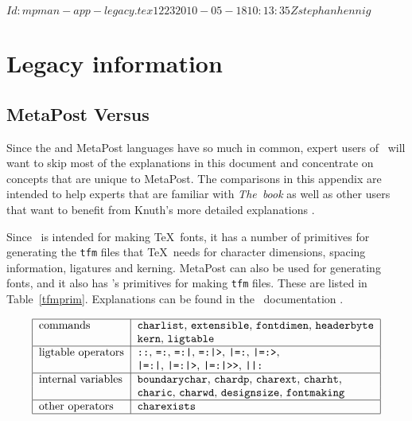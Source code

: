 \svnInfo $Id: mpman-app-legacy.tex 1223 2010-05-18 10:13:35Z stephanhennig $
\section{Legacy information}
\label{legacy}

\subsection{MetaPost Versus \MF}
\label{MPvsMF}

Since the \MF{} and MetaPost languages have so much in
common, expert users of \MF\ will want to skip most of the explanations
in this document and concentrate on concepts that are unique to
MetaPost.  The comparisons in this appendix are intended to help experts
that are familiar with {\sl The\ \MF book} as well as other users that
want to benefit from Knuth's more detailed explanations \cite{kn:c}.

Since \MF\ is intended for making \TeX\ fonts, it has a number of
primitives for generating the {\tt tfm} files that \TeX\ needs for character
dimensions, spacing information, ligatures and
kerning.  MetaPost can also be used for generating fonts,
and it also has \MF's primitives for making {\tt tfm} files.  These are
listed in Table~\ref{tfmprim}.  Explanations can be found in the \MF\
documentation \cite{kn:c,kn:mf3}.

\begin{table}[htp]
$$\begin{tabular}{|l|l|}  \hline
commands&               {\tt charlist}, {\tt extensible},
                        {\tt fontdimen}, {\tt headerbyte}               \\
        &               {\tt kern}, {\tt ligtable}                      \\ \hline
ligtable operators&     \verb!::!, \verb!=:!, \verb!=:|!, \verb!=:|>!,
                        \verb!|=:!, \verb!|=:>!,                        \\
        &               \verb!|=:|!, \verb!|=:|>!, \verb!|=:|>>!,
                        \verb!||:!                                      \\ \hline
internal variables\index{internal variables}\index{variables!internal}&
                        {\tt boundarychar}, {\tt chardp},
                        {\tt charext}, {\tt charht},                    \\
        &               {\tt charic}, {\tt charwd},
                        {\tt designsize}, {\tt fontmaking}              \\ \hline
other operators&        {\tt charexists}                                \\ \hline
\end{tabular}
$$
\caption{MetaPost primitives for making {\tt tfm} files.}
\label{tfmprim}
\end{table}

